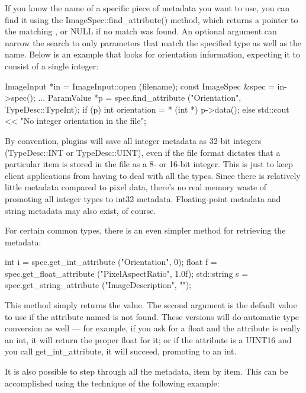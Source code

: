 If you know the name of a specific piece of metadata you want to use,
you can find it using the {\cf ImageSpec::find_attribute()}
method, which returns a pointer to the matching \ParamValue,
or {\cf NULL} if no match was found.  An optional \TypeDesc
argument can narrow the search to only parameters that match the
specified type as well as the name.  Below is an
example that looks for orientation information, expecting it to consist 
of a single integer:

\begin{code}
        ImageInput *in = ImageInput::open (filename);
        const ImageSpec &spec = in->spec();
        ...
        ParamValue *p = spec.find_attribute ("Orientation", TypeDesc::TypeInt);
        if (p) {
            int orientation = * (int *) p->data();
        } else {
            std::cout << "No integer orientation in the file\n";
        }
\end{code}

By convention, \ImageInput plugins will save all integer metadata as
32-bit integers ({\cf TypeDesc::INT} or {\cf TypeDesc::UINT}), even if the file format
dictates that a particular item is stored in the file as a 8- or 16-bit
integer.  This is just to keep client applications from having to deal
with all the types.  Since there is relatively little metadata compared
to pixel data, there's no real memory waste of promoting all integer
types to int32 metadata.  Floating-point metadata and string metadata
may also exist, of course.

For certain common types, there is an even simpler method for retrieving
the metadata:

\begin{code}
    int i = spec.get_int_attribute ("Orientation", 0);
    float f = spec.get_float_attribute ("PixelAspectRatio", 1.0f);
    std::string s = spec.get_string_attribute ("ImageDescription", "");
\end{code}

This method simply returns the value.  The second argument is the
default value to use if the attribute named is not found.  These
versions will do automatic type conversion as well --- for example,
if you ask for a float and the attribute is really an int, it will 
return the proper float for it; or if the attribute is a UINT16 and
you call {\cf get_int_attribute}, it will succeed, promoting to an int.

It is also possible to step through all the metadata, item by item.
This can be accomplished using the technique of the following example:

